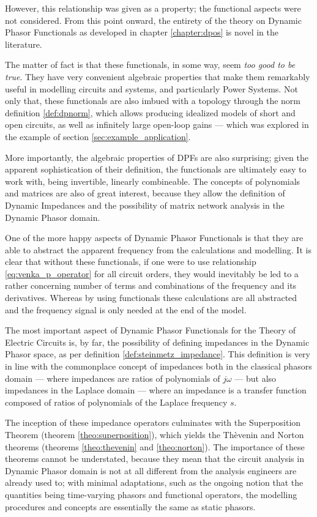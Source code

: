 	However, this relationship was given as a property; the functional aspects were not considered. From this point onward, the entirety of the theory on Dynamic Phasor Functionals as developed in chapter \ref{chapter:dpos} is novel in the literature.

	The matter of fact is that these functionals, in some way, seem \textit{too good to be true}. They have very convenient algebraic properties that make them remarkably useful in modelling circuits and systems, and particularly Power Systems. Not only that, these functionals are also imbued with a topology through the norm definition \ref{def:dpnorm}, which allows producing idealized models of short and open circuits, as well as infinitely large open-loop gains — which was explored in the example of section \ref{sec:example_application}.

	More importantly, the algebraic properties of DPFs are also surprising; given the apparent sophistication of their definition, the functionals are ultimately easy to work with, being invertible, linearly combineable. The concepts of polynomials and matrices are also of great interest, because they allow the definition of Dynamic Impedances and the possibility of matrix network analysis in the Dynamic Phasor domain.

	One of the more happy aspects of Dynamic Phasor Functionals is that they are able to abstract the apparent frequency from the calculations and modelling. It is clear that without these functionals, if one were to use relationship \eqref{eq:venka_p_operator} for all circuit orders, they would inevitably be led to a rather concerning number of terms and combinations of the frequency and its derivatives. Whereas by using functionals these calculations are all abstracted and the frequency signal is only needed at the end of the model.

	The most important aspect of Dynamic Phasor Functionals for the Theory of Electric Circuits is, by far, the possibility of defining impedances in the Dynamic Phasor space, as per definition \ref{def:steinmetz_impedance}. This definition is very in line with the commonplace concept of impedances both in the classical phasors domain — where impedances are ratios of polynomials of $j\omega$ — but also impedances in the Laplace domain — where an impedance is a transfer function composed of ratios of polynomials of the Laplace frequency $s$.

	The inception of these impedance operators culminates with the Superposition Theorem (theorem \ref{theo:superposition}), which yields the Thèvenin and Norton theorems (theorems \ref{theo:thevenin} and \ref{theo:norton}). The importance of these theorems cannot be understated, because they mean that the circuit analysis in Dynamic Phasor domain is not at all different from the analysis engineers are already used to; with minimal adaptations, such as the ongoing notion that the quantities being time-varying phasors and functional operators, the modelling procedures and concepts are essentially the same as static phasors.

